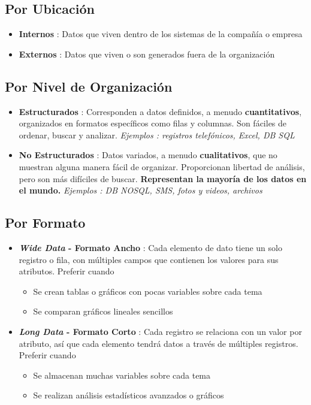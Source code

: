 \subsection{Por Ubicación}
\begin{itemize}
    \item {\textbf{Internos} : Datos que viven dentro de los sistemas de la compañía o empresa}
    \item {\textbf{Externos} : Datos que viven o son generados fuera de la organización}
\end{itemize}

\subsection{Por Nivel de Organización}
\begin{itemize}
    \item {\textbf{Estructurados} : Corresponden a datos definidos, a menudo \textbf{cuantitativos}, organizados en formatos específicos como filas y columnas. Son fáciles de ordenar, buscar y analizar. \textit{Ejemplos : registros telefónicos, Excel, DB SQL}}
    \item {\textbf{No Estructurados} : Datos variados, a menudo \textbf{cualitativos}, que no muestran alguna manera fácil de organizar. Proporcionan libertad de análisis, pero son más difíciles de buscar. \textbf{Representan la mayoría de los datos en el mundo.} \textit{Ejemplos : DB NOSQL, SMS, fotos y videos, archivos}}
\end{itemize}

\subsection{Por Formato}
\begin{itemize}
    \item {\textbf{\textit{Wide Data} - Formato Ancho} : Cada elemento de dato tiene un solo registro o fila, con múltiples campos que contienen los valores para sus atributos. Preferir cuando
    \begin{itemize}
        \item {Se crean tablas o gráficos con pocas variables sobre cada tema}
        \item {Se comparan gráficos lineales sencillos}
    \end{itemize}}
    \item {\textbf{\textit{Long Data} - Formato Corto} : Cada registro se relaciona con un valor por atributo, así que cada elemento tendrá datos a través de múltiples registros. Preferir cuando
    \begin{itemize}
        \item {Se almacenan muchas variables sobre cada tema}
        \item {Se realizan análisis estadísticos avanzados o gráficos}
    \end{itemize}}
\end{itemize}


